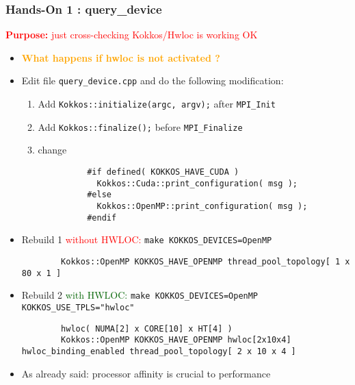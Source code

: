 \begin{frame}[fragile=singleslide]
  \frametitle{Hands-On 1 : query\_device}

  {\large\textcolor{red}{\textbf{Purpose:} just cross-checking Kokkos/Hwloc is working OK}}

  \begin{itemize}
  \item \textcolor{orange}{\textbf{What happens if hwloc is not activated ?}}
  \item Edit file \texttt{query\_device.cpp} and do the following modification:
    \begin{enumerate}
    \item Add \texttt{Kokkos::initialize(argc, argv);} after \texttt{MPI\_Init}
    \item Add \texttt{Kokkos::finalize();} before \texttt{MPI\_Finalize}
    \item change\\
      {\small
        \begin{verbatim}
          #if defined( KOKKOS_HAVE_CUDA )
            Kokkos::Cuda::print_configuration( msg );
          #else
            Kokkos::OpenMP::print_configuration( msg );
          #endif
        \end{verbatim}
      }
    \end{enumerate}
  \item {\small Rebuild 1 \textcolor{red}{without HWLOC:} \texttt{make KOKKOS\_DEVICES=OpenMP}}
    {\small
      \begin{verbatim}
        Kokkos::OpenMP KOKKOS_HAVE_OPENMP thread_pool_topology[ 1 x 80 x 1 ]
      \end{verbatim}
    }
  \item {\small Rebuild 2 \textcolor{darkgreen}{with HWLOC:} \texttt{make KOKKOS\_DEVICES=OpenMP KOKKOS\_USE\_TPLS="hwloc"}}
    {\small 
      \begin{verbatim}
        hwloc( NUMA[2] x CORE[10] x HT[4] )
        Kokkos::OpenMP KOKKOS_HAVE_OPENMP hwloc[2x10x4] hwloc_binding_enabled thread_pool_topology[ 2 x 10 x 4 ]      
      \end{verbatim}
    }
    \item As already said: processor affinity is crucial to performance
  \end{itemize}

\end{frame}

